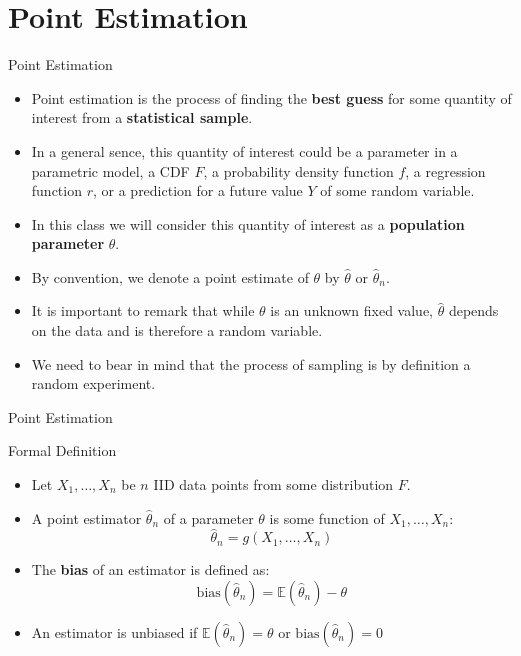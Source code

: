 \documentclass[handout]{beamer}
\begin{document}
\section{Point Estimation}

\begin{frame}{Point Estimation}
\scriptsize{
\begin{itemize}
 \item Point estimation is the process of finding the \textbf{best guess} for some quantity of interest from a \textbf{statistical sample}.
 \item In a general sence, this quantity of interest could be a parameter in a parametric model, a CDF $F$, a probability density function $f$, a regression function $r$, or a prediction for a future value $Y$ of some random variable.
 \item In this class we will consider this quantity of interest as a \textbf{population parameter} $\theta$. 
  \item By convention, we denote a point estimate of $\theta$ by $\hat{\theta}$ or $\hat{\theta}_n$.
 \item It is important to remark that while $\theta$ is an unknown fixed value, $\hat{\theta}$  depends on the data and is therefore a random variable. 
 \item We need to bear in mind that the process of sampling is by definition a random experiment. 
 
\end{itemize}

} 
\end{frame}

\begin{frame}{Point Estimation}


\scriptsize{
\begin{block}{Formal Definition}
\begin{itemize}
 \item Let $X_1, \dots, X_n$ be $n$ IID data points  from some distribution  $F$.
 \item A point estimator $\hat{\theta}_n$  of a parameter $\theta$ is some function of $X_1, \dots, X_n$:
 \begin{displaymath}
 \hat{\theta}_n=g(X_1, \dots, X_n) 
 \end{displaymath}
 
\end{itemize}

 
\end{block}

\begin{itemize}
 \item The \textbf{bias} of an estimator is defined as: 
\begin{displaymath}
 \text{bias}(\hat{\theta}_n)=\mathbb{E}(\hat{\theta}_n)-\theta
\end{displaymath}
\item An estimator is unbiased if $\mathbb{E}(\hat{\theta}_n)=\theta$ or  $\text{bias}(\hat{\theta}_n)=0 $
\end{itemize}

} 
\end{frame}
\end{document}
